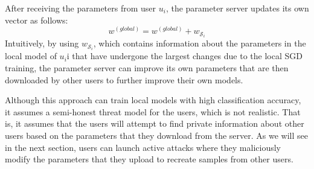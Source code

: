 \documentclass[conference]{IEEEtran}
\begin{document}



After receiving the parameters from user $u_i$, the parameter server updates its own vector as follows:
$$w^{(global)} =  w^{(global)} +  w_{\mathcal{S}_i}$$
Intuitively, by using $w_{\mathcal{S}_i}$, which contains information about the parameters in the local model of $u_i$i that have
undergone the largest changes due to the local SGD training, the parameter server can improve its own parameters that are then
downloaded by other users to further improve their own models.  


Although this approach can train local models with high classification accuracy,  it assumes a semi-honest threat model for the users,
which is not realistic. That is, it assumes that the users will attempt to find private information about other users based on 
the parameters that they download from the server. As we will see in the next section, users can launch active attacks where they
maliciously modify the parameters that they upload to recreate samples from other users. 







\end{document}
